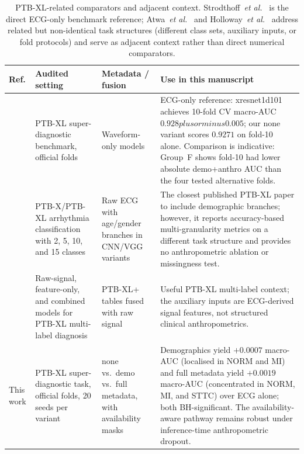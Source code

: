\documentclass[mathematics,article,submit,pdftex]{Definitions/mdpi}
\def\texttt#1{#1}%
\def\textbf#1{#1}%
\def\pm{plus or minus }%
\begin{document}
\begin{table}[H]
\caption{PTB-XL-related comparators and adjacent context. Strodthoff~\textit{et al.}~\cite{Strodthoff2021} is the direct ECG-only benchmark reference; Atwa~\textit{et al.}~\cite{Atwa2025} and Holloway~\textit{et al.}~\cite{Holloway2026} address related but non-identical task structures (different class sets, auxiliary inputs, or fold protocols) and serve as adjacent context rather than direct numerical comparators.}
\label{tab:prior_a}
\centering
\scriptsize
\setlength{\tabcolsep}{3pt}
\begin{tabularx}{\textwidth}{>{\raggedright\arraybackslash}p{}>{\raggedright\arraybackslash}p{}>{\raggedright\arraybackslash}p{}>{\raggedright\arraybackslash}X}
\toprule
\textbf{Ref.} & \textbf{Audited setting} & \textbf{Metadata / fusion} & \textbf{Use in this manuscript} \\
\midrule
\cite{Strodthoff2021} & PTB-XL super-diagnostic benchmark, official folds & Waveform-only models & ECG-only reference: xresnet1d101 achieves 10-fold CV macro-AUC $0.928 \pm 0.005$; our \texttt{none} variant scores $0.9271$ on fold-10 alone. Comparison is indicative: Group~F shows fold-10 had lower absolute demo+anthro AUC than the four tested alternative folds. \\
\cite{Atwa2025} & PTB-X/PTB-XL arrhythmia classification with 2, 5, 10, and 15 classes & Raw ECG with age/gender branches in CNN/VGG variants & The closest published PTB-XL paper to include demographic branches; however, it reports accuracy-based multi-granularity metrics on a different task structure and provides no anthropometric ablation or missingness test. \\
\cite{Holloway2026} & Raw-signal, feature-only, and combined models for PTB-XL multi-label diagnosis & PTB-XL+ tables fused with raw signal & Useful PTB-XL multi-label context; the auxiliary inputs are ECG-derived signal features, not structured clinical anthropometrics. \\
\midrule
\textbf{This work} & PTB-XL super-diagnostic task, official folds, \textbf{20 seeds} per variant & none vs.\ demo vs.\ full metadata, with availability masks & Demographics yield $+0.0007$ macro-AUC (localised in NORM and MI) and full metadata yield $+0.0019$ macro-AUC (concentrated in NORM, MI, and STTC) over ECG alone; both BH-significant. The availability-aware pathway remains robust under inference-time anthropometric dropout. \\
\bottomrule
\end{tabularx}
\end{table}
\end{document}
